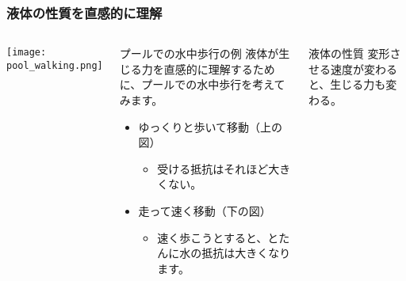 \documentclass[12pt, dvipdfmx]{beamer}
\begin{document}
\begin{frame}
	\frametitle{液体の性質を直感的に理解}
		\begin{columns}[T, onlytextwidth]
					\begin{center}
						\texttt{[image: pool\_walking.png]}
					\end{center}
				\begin{block}{プールでの水中歩行の例}
					液体が生じる力を直感的に理解するために、プールでの水中歩行を考えてみます。
					\begin{itemize}
						\item ゆっくりと歩いて移動（上の図）
						\begin{itemize}
							\item 受ける抵抗はそれほど大きくない。
						\end{itemize}
						\item 走って速く移動（下の図）
						\begin{itemize}
							\item 速く歩こうとすると、とたんに水の抵抗は大きくなります。
						\end{itemize}
					\end{itemize}
				\end{block}
				\begin{exampleblock}{液体の性質}
					\alert{変形させる速度}が変わると、生じる力も変わる。
				\end{exampleblock}
		\end{columns}
\end{frame}
\end{document}
